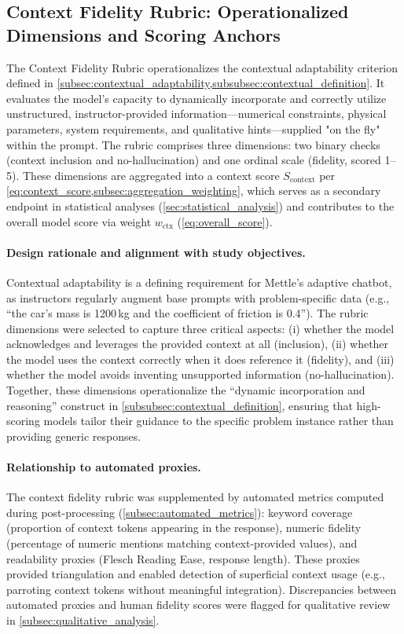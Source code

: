 \subsection{Context Fidelity Rubric: Operationalized Dimensions and Scoring Anchors}
\label{app:context_fidelity_rubric}

The Context Fidelity Rubric operationalizes the contextual adaptability criterion defined in \cref{subsec:contextual_adaptability,subsubsec:contextual_definition}. It evaluates the model's capacity to dynamically incorporate and correctly utilize unstructured, instructor-provided information—numerical constraints, physical parameters, system requirements, and qualitative hints—supplied "on the fly" within the prompt. The rubric comprises three dimensions: two binary checks (context inclusion and no-hallucination) and one ordinal scale (fidelity, scored 1--5). These dimensions are aggregated into a context score $S_{\text{context}}$ per \cref{eq:context_score,subsec:aggregation_weighting}, which serves as a secondary endpoint in statistical analyses (\cref{sec:statistical_analysis}) and contributes to the overall model score via weight $w_{\text{ctx}}$ (\cref{eq:overall_score}).

\paragraph{Design rationale and alignment with study objectives.} Contextual adaptability is a defining requirement for Mettle's adaptive chatbot, as instructors regularly augment base prompts with problem-specific data (e.g., ``the car's mass is 1200\,kg and the coefficient of friction is 0.4''). The rubric dimensions were selected to capture three critical aspects: (i) whether the model acknowledges and leverages the provided context at all (inclusion), (ii) whether the model uses the context correctly when it does reference it (fidelity), and (iii) whether the model avoids inventing unsupported information (no-hallucination). Together, these dimensions operationalize the ``dynamic incorporation and reasoning'' construct in \cref{subsubsec:contextual_definition}, ensuring that high-scoring models tailor their guidance to the specific problem instance rather than providing generic responses.

\paragraph{Relationship to automated proxies.} The context fidelity rubric was supplemented by automated metrics computed during post-processing (\cref{subsec:automated_metrics}): keyword coverage (proportion of context tokens appearing in the response), numeric fidelity (percentage of numeric mentions matching context-provided values), and readability proxies (Flesch Reading Ease, response length). These proxies provided triangulation and enabled detection of superficial context usage (e.g., parroting context tokens without meaningful integration). Discrepancies between automated proxies and human fidelity scores were flagged for qualitative review in \cref{subsec:qualitative_analysis}.

